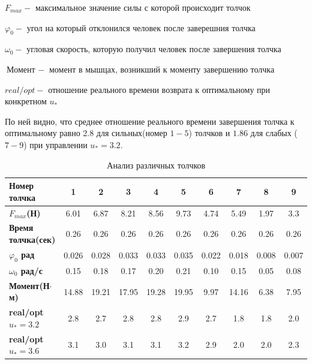 \documentclass[a4paper,12pt, openany]{book}
\theoremstyle{plain} %
\theoremstyle{definition} %
\theoremstyle{remark} %
\numberwithin{equation}{chapter}
\begin{document}
{$F_{max} - $ максимальное значение силы с которой происходит толчок

$\varphi_0 - $ угол на который отклонился человек после заверешния толчка

$\omega_0 - $ угловая скорость, которую получил человек после завершения толчка

$\text{Момент } - $ момент в мышцах, возникший к моменту завершению толчка

$real/opt - $ отношение реального времени возврата к оптимальному при конкретном $u_\ast$

По ней видно, что среднее отношение реального времени завершения толчка к оптимальному равно 2.8 для сильных(номер $1-5$)
толчков и $1.86$ для слабых ($7-9$) при управлении $u_*=3.2$.


\begin{table}[h!]
    \centering
    \begin{tabular}{|l|c|c|c|c|c|c|c|c|c|}
        \hline
        \textbf{Номер толчка}       & \textbf{1} & \textbf{2} & \textbf{3} & \textbf{4} & \textbf{5} & \textbf{6} & \textbf{7} & \textbf{8} & \textbf{9} \\ \hline
        \textbf{$F_{max}$(Н)}       & 6.01       & 6.87       & 8.21       & 8.56       & 9.73       & 4.74       & 5.49       & 1.97       & 3.3        \\ \hline
        \textbf{Время толчка(сек)}  & 0.26       & 0.26       & 0.26       & 0.26       & 0.26       & 0.26       & 0.26       & 0.26       & 0.26       \\ \hline
        \textbf{$\varphi_0$ рад}        & 0.026      & 0.028      & 0.033      & 0.033      & 0.035      & 0.022      & 0.018      & 0.008      & 0.007      \\ \hline
        \textbf{$\omega_0$ рад/с}         & 0.15     & 0.18     & 0.17     & 0.20     & 0.21     & 0.10     & 0.15     & 0.05     & 0.08     \\ \hline
        \textbf{Момент(Н$\cdot$м)}       & 14.88      & 19.21      & 17.95      & 19.28      & 19.95      & 9.97       & 14.16      & 6.38       & 7.95       \\ \hline
        \textbf{real/opt $u_*=3.2$} & 2.8        & 2.7        & 2.8        & 2.8        & 2.9        & 2.7        & 1.8        & 1.8        & 2.0        \\ \hline
        \textbf{real/opt $u_*=3.6$} & 3.1        & 3.0        & 3.1        & 3.1        & 3.2        & 2.9        & 2.0        & 2.0        & 2.3        \\ \hline
    \end{tabular}
    \caption{Анализ различных толчков}
    \label{final_table}
\end{table}
\newpage
}
\end{document}
